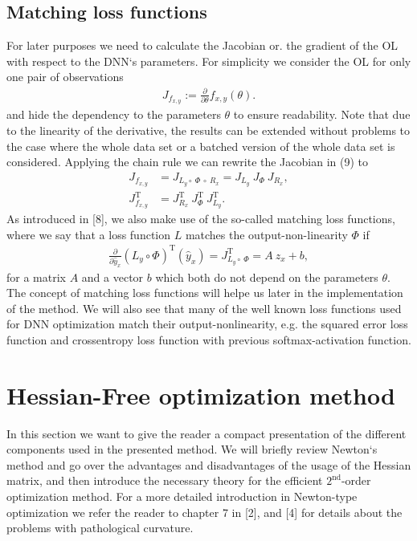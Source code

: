 \documentclass[conference]{IEEEtran}
\begin{document}
	\subsection{Matching loss functions}
	For later purposes we need to calculate the Jacobian or. the gradient of the OL with respect to the DNN`s parameters. For simplicity we consider the OL for only one pair of observations
	\begin{align}
	J_{f_{x, y}} := \frac{\partial}{\partial\theta}f_{x, y}(\theta).
	\end{align}
	and hide the dependency to the parameters $\theta$ to ensure readability.
	Note that due to the linearity of the derivative, the results can be extended without problems to the case where the whole data set or a batched version of the whole data set is considered.
	Applying the chain rule we can rewrite the Jacobian in (9) to
	\begin{align}
	J_{f_{x, y}} &= J_{L_{y}\circ \:\Phi \:\circ\:R_{x}} = J_{L_{y}} \: J_{\Phi} \: J_{R_{x}},\\
	J_{f_{x, y}}^{\mathrm{T}} &= J_{R_{x}}^{\mathrm{T}} \: J_{\Phi}^{\mathrm{T}} \: J_{L_{y}}^{\mathrm{T}}.
	\end{align}
	As introduced in [8], we also make use of the so-called matching loss functions, where we say that a loss function $L$ matches the output-non-linearity $\Phi$ if
	\begin{align}
	\frac{\partial}{\partial\hat{y}_{x}}\left(L_{y}\circ \Phi\right)^{\mathrm{T}}(\hat{y}_{x})= J_{L_{y}\circ \:\Phi}^{\mathrm{T}} = A\: z_{x} + b,
	\end{align}
	for a matrix $A$ and a vector $b$ which both do not depend on the parameters $\theta$.
	The concept of matching loss functions will helpe us later in the implementation of the method. We will also see that many of the well known loss functions used for DNN optimization match their output-nonlinearity, e.g. the squared error loss function and crossentropy loss function with previous softmax-activation function.
	
	
	\section{Hessian-Free optimization method}
	In this section we want to give the reader a compact presentation of the different components used in the presented method. We will briefly review Newton`s method and go over the advantages and disadvantages of the usage of the Hessian matrix, and then introduce the necessary theory for the efficient $2^{\text{nd}}$-order optimization method. For a more detailed introduction in Newton-type optimization we refer the reader to chapter 7 in [2], and [4] for details about the problems with pathological curvature. 
	
\end{document}

